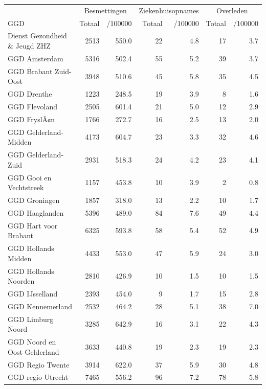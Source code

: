 \documentclass[
  english,
  man,floatsintext]{apa6}
\begin{document}
\begin{table}[H]
\centering\begingroup\fontsize{10}{12}\selectfont

\begin{threeparttable}
\begin{tabular}{lrrrrrr}
\toprule
\multicolumn{1}{c}{ } & \multicolumn{2}{c}{Besmettingen} & \multicolumn{2}{c}{Ziekenhuisopnames} & \multicolumn{2}{c}{Overleden} \\
\cmidrule(l{3pt}r{3pt}){2-3} \cmidrule(l{3pt}r{3pt}){4-5} \cmidrule(l{3pt}r{3pt}){6-7}
GGD & Totaal & /100000 & Totaal & /100000 & Totaal & /100000\\
\midrule
Dienst Gezondheid \& Jeugd ZHZ & 2513 & 550.0 & 22 & 4.8 & 17 & 3.7\\
GGD Amsterdam & 5316 & 502.4 & 55 & 5.2 & 39 & 3.7\\
GGD Brabant Zuid-Oost & 3948 & 510.6 & 45 & 5.8 & 35 & 4.5\\
GGD Drenthe & 1223 & 248.5 & 19 & 3.9 & 8 & 1.6\\
GGD Flevoland & 2505 & 601.4 & 21 & 5.0 & 12 & 2.9\\
GGD FryslÃ¢n & 1766 & 272.7 & 16 & 2.5 & 13 & 2.0\\
GGD Gelderland-Midden & 4173 & 604.7 & 23 & 3.3 & 32 & 4.6\\
GGD Gelderland-Zuid & 2931 & 518.3 & 24 & 4.2 & 23 & 4.1\\
GGD Gooi en Vechtstreek & 1157 & 453.8 & 10 & 3.9 & 2 & 0.8\\
GGD Groningen & 1857 & 318.0 & 13 & 2.2 & 10 & 1.7\\
GGD Haaglanden & 5396 & 489.0 & 84 & 7.6 & 49 & 4.4\\
GGD Hart voor Brabant & 6325 & 593.8 & 58 & 5.4 & 52 & 4.9\\
GGD Hollands Midden & 4433 & 553.0 & 47 & 5.9 & 24 & 3.0\\
GGD Hollands Noorden & 2810 & 426.9 & 10 & 1.5 & 10 & 1.5\\
GGD IJsselland & 2393 & 454.0 & 9 & 1.7 & 15 & 2.8\\
GGD Kennemerland & 2532 & 464.2 & 28 & 5.1 & 38 & 7.0\\
GGD Limburg Noord & 3285 & 642.9 & 16 & 3.1 & 22 & 4.3\\
GGD Noord en Oost Gelderland & 3633 & 440.8 & 19 & 2.3 & 19 & 2.3\\
GGD Regio Twente & 3914 & 622.0 & 37 & 5.9 & 30 & 4.8\\
GGD regio Utrecht & 7465 & 556.2 & 96 & 7.2 & 78 & 5.8\\

\end{tabular}
\end{threeparttable}
\end{table}
\end{document}
